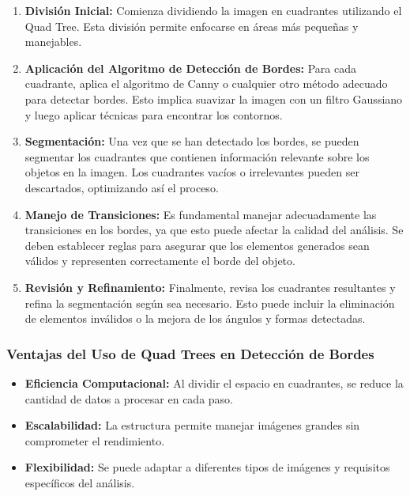 \documentclass[9pt,a4paper,twoside]{rho-class/rho}
\begin{document}
        \begin{enumerate}
            \item \textbf{División Inicial:} Comienza dividiendo la imagen en cuadrantes utilizando el Quad Tree. Esta división permite enfocarse en áreas más pequeñas y manejables.
            
            \item \textbf{Aplicación del Algoritmo de Detección de Bordes:} Para cada cuadrante, aplica el algoritmo de Canny o cualquier otro método adecuado para detectar bordes. Esto implica suavizar la imagen con un filtro Gaussiano y luego aplicar técnicas para encontrar los contornos.
            
            \item \textbf{Segmentación:} Una vez que se han detectado los bordes, se pueden segmentar los cuadrantes que contienen información relevante sobre los objetos en la imagen. Los cuadrantes vacíos o irrelevantes pueden ser descartados, optimizando así el proceso.
            
            \item \textbf{Manejo de Transiciones:} Es fundamental manejar adecuadamente las transiciones en los bordes, ya que esto puede afectar la calidad del análisis. Se deben establecer reglas para asegurar que los elementos generados sean válidos y representen correctamente el borde del objeto.
            
            \item \textbf{Revisión y Refinamiento:} Finalmente, revisa los cuadrantes resultantes y refina la segmentación según sea necesario. Esto puede incluir la eliminación de elementos inválidos o la mejora de los ángulos y formas detectadas.
        \end{enumerate}
        
        \subsubsection{Ventajas del Uso de Quad Trees en Detección de Bordes}
        
        \begin{itemize}
            \item \textbf{Eficiencia Computacional:} Al dividir el espacio en cuadrantes, se reduce la cantidad de datos a procesar en cada paso.
            
            \item \textbf{Escalabilidad:} La estructura permite manejar imágenes grandes sin comprometer el rendimiento.
            
            \item \textbf{Flexibilidad:} Se puede adaptar a diferentes tipos de imágenes y requisitos específicos del análisis.
        \end{itemize}
        
\end{document}

